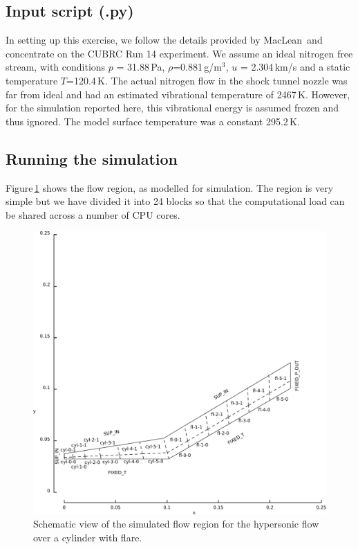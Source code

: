 \bigskip
\subsection{Input script (.py)}
%
In setting up this exercise, we follow the details provided by MacLean\,\cite{maclean_holden_2004a}
and concentrate on the CUBRC Run 14 experiment.
We assume an ideal nitrogen free stream, with conditions 
$p$ = 31.88\,Pa, $\rho$=0.881\,g/m$^3$, $u$ = 2.304\,km/s and a static temperature $T$=120.4\,K.
The actual nitrogen flow in the shock tunnel nozzle was far from ideal and had an estimated
vibrational temperature of 2467\,K.
However, for the simulation reported here, this vibrational energy is assumed frozen and thus ignored.
The model surface temperature was a constant 295.2\,K.

\noindent
\topbar

\bottombar


\bigskip
\subsection{Running the simulation}
%
Figure\,\ref{fig:cylinder-flare-geometry} shows the flow region, as modelled for simulation.
The region is very simple but we have divided it into 24 blocks so that the computational load 
can be shared across a number of CPU cores.

\begin{figure}[htbp]
 \centering
 \includegraphics[width=\textwidth,viewport=0 0 517 321,clip=true]{../2D/cylinder-flare/cyl-flare-edited.pdf}
 \caption{Schematic view of the simulated flow region for the hypersonic flow
          over a cylinder with flare.}
 \label{fig:cylinder-flare-geometry}
\end{figure}

